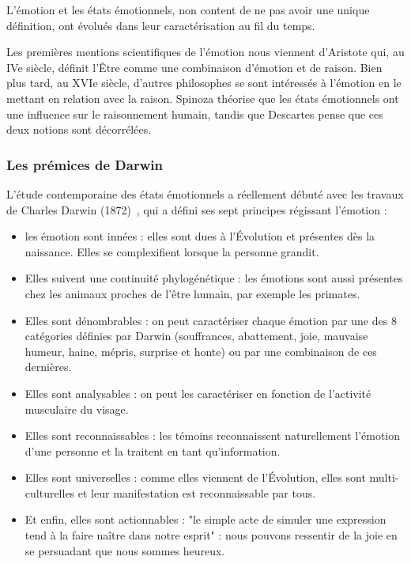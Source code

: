 L'émotion et les états émotionnels, non content de ne pas avoir une unique définition, ont évolués dans leur caractérisation au fil du temps.

Les premières mentions scientifiques de l'émotion nous viennent d'Aristote qui, au IVe siècle, définit l'Être comme une combinaison d'émotion et de raison. Bien plus tard, au XVIe siècle, d'autres philosophes se sont intéressés à l'émotion en le mettant en relation avec la raison. Spinoza théorise que les états émotionnels ont une influence sur le raisonnement humain, tandis que Descartes pense que ces deux notions sont décorrélées.

\subsubsection{Les prémices de Darwin}
L'étude contemporaine des états émotionnels a réellement débuté avec les travaux de Charles Darwin (1872)~\cite{Darwin1872}, qui a défini ses sept principes régissant l'émotion :
\begin{itemize}
    \item les émotion sont innées : elles sont dues à l'Évolution et présentes dès la naissance. Elles se complexifient lorsque la personne grandit.
    \item Elles suivent une continuité phylogénétique : les émotions sont aussi présentes chez les animaux proches de l'être humain, par exemple les primates.
    \item Elles sont dénombrables : on peut caractériser chaque émotion par une des 8 catégories définies par Darwin (souffrances, abattement, joie, mauvaise humeur, haine, mépris, surprise et honte) ou par une combinaison de ces dernières.
    \item Elles sont analysables : on peut les caractériser en fonction de l'activité musculaire du visage.
    \item Elles sont reconnaissables : les témoins reconnaissent naturellement l'émotion d'une personne et la traitent en tant qu'information.
    \item Elles sont universelles : comme elles viennent de l'Évolution, elles sont multi-culturelles et leur manifestation est reconnaissable par tous.
    \item Et enfin, elles sont actionnables : "le simple acte de simuler une expression tend à la faire naître dans notre esprit" : nous pouvons ressentir de la joie en se persuadant que nous sommes heureux.
\end{itemize}

